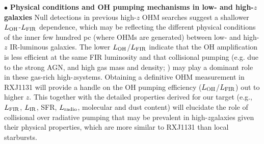 \documentclass[letterpaper,11pt]{article}
\newcommand{\LIR}{\mbox{$L_{\rm IR}$}\xspace}
\newcommand{\LFIR}{\mbox{$L_{\rm FIR}$}\xspace}
\newcommand{\LOH}{$L_{\rm OH}$\xspace}
\newcommand{\ssim}{\,$\sim$\,}
\newcommand{\highz}{high-$z$\space}
\begin{document}
%
\noindent $\bullet$ {\bf Physical conditions and OH pumping mechanisms in low- and high-$z$ galaxies}
Null detections in previous high-$z$ OHM searches suggest a shallower \LOH-\LFIR dependence, which may be
reflecting the different physical conditions of the inner few hundred pc (where OHMs are generated) 
between low- and high-$z$ IR-luminous galaxies.
The lower \LOH/\LFIR indicate that the OH amplification is less efficient at the same FIR luminosity 
and that collisional pumping (e.g. due to the strong AGN, and high gas mass and density; \citealt{Field94a}) %
%
may play a dominant role in these gas-rich \highz systems.
Obtaining a definitive OHM measurement in RXJ1131 will provide a handle on the OH pumping efficiency (\LOH/\LFIR) out to higher $z$.
This together with the detailed properties derived for our target (e.g., \LFIR, \LIR, SFR, $L_{\rm radio}$, molecular and dust content)
will elucidate the role of collisional over radiative pumping
that may be prevalent in \highz galaxies given their physical properties, which are more similar to RXJ1131 than 
local starbursts. %
\end{document}
